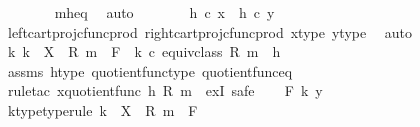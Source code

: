 \begin{isabellebody}
\ \ \ \ \ \ \isamarkupfalse%
\ m{\isacharunderscore}{\kern0pt}h{\isacharunderscore}{\kern0pt}eq\ \isamarkupfalse%
\ auto\isanewline
\ \ \ \ \isamarkupfalse%
\ \isamarkupfalse%
\ {\isachardoublequoteopen}h\ {\isasymcirc}\isactrlsub c\ x\ {\isacharequal}{\kern0pt}\ h\ {\isasymcirc}\isactrlsub c\ y{\isachardoublequoteclose}\isanewline
\ \ \ \ \ \ \isamarkupfalse%
\ left{\isacharunderscore}{\kern0pt}cart{\isacharunderscore}{\kern0pt}proj{\isacharunderscore}{\kern0pt}cfunc{\isacharunderscore}{\kern0pt}prod\ right{\isacharunderscore}{\kern0pt}cart{\isacharunderscore}{\kern0pt}proj{\isacharunderscore}{\kern0pt}cfunc{\isacharunderscore}{\kern0pt}prod\ x{\isacharunderscore}{\kern0pt}type\ y{\isacharunderscore}{\kern0pt}type\ \isamarkupfalse%
\ auto\isanewline
\ \ \isamarkupfalse%
\isanewline
\ \ \isamarkupfalse%
\ \isamarkupfalse%
\ {\isachardoublequoteopen}{\isasymexists}k{\isachardot}{\kern0pt}\ k\ {\isacharcolon}{\kern0pt}\ X\ {\isasymsslash}\ {\isacharparenleft}{\kern0pt}R{\isacharcomma}{\kern0pt}\ m{\isacharparenright}{\kern0pt}\ {\isasymrightarrow}\ F\ {\isasymand}\ k\ {\isasymcirc}\isactrlsub c\ equiv{\isacharunderscore}{\kern0pt}class\ {\isacharparenleft}{\kern0pt}R{\isacharcomma}{\kern0pt}\ m{\isacharparenright}{\kern0pt}\ {\isacharequal}{\kern0pt}\ h{\isachardoublequoteclose}\isanewline
\ \ \ \ \isamarkupfalse%
\ assms\ h{\isacharunderscore}{\kern0pt}type\ quotient{\isacharunderscore}{\kern0pt}func{\isacharunderscore}{\kern0pt}type\ quotient{\isacharunderscore}{\kern0pt}func{\isacharunderscore}{\kern0pt}eq\isanewline
\ \ \ \ \isamarkupfalse%
\ {\isacharparenleft}{\kern0pt}rule{\isacharunderscore}{\kern0pt}tac\ x{\isacharequal}{\kern0pt}{\isachardoublequoteopen}quotient{\isacharunderscore}{\kern0pt}func\ h\ {\isacharparenleft}{\kern0pt}R{\isacharcomma}{\kern0pt}\ m{\isacharparenright}{\kern0pt}{\isachardoublequoteclose}\ \ exI{\isacharcomma}{\kern0pt}\ safe{\isacharparenright}{\kern0pt}\isanewline
{}\isamarkupfalse%
\isanewline
\ \ \isamarkupfalse%
\ F\ k\ y\isanewline
\ \ \isamarkupfalse%
\ k{\isacharunderscore}{\kern0pt}type{\isacharbrackleft}{\kern0pt}type{\isacharunderscore}{\kern0pt}rule{\isacharbrackright}{\kern0pt}{\isacharcolon}{\kern0pt}\ {\isachardoublequoteopen}k\ {\isacharcolon}{\kern0pt}\ X\ {\isasymsslash}\ {\isacharparenleft}{\kern0pt}R{\isacharcomma}{\kern0pt}\ m{\isacharparenright}{\kern0pt}\ {\isasymrightarrow}\ F{\isachardoublequoteclose}\isanewline

\end{isabellebody}
